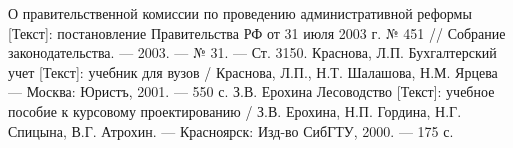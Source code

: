 \newpage 
{} 

\begin{thebibliography}{}
	 О правительственной комиссии по проведению административной реформы [Текст]: постановление Правительства РФ от 31 июля 2003 г. № 451 // Собрание законодательства. — 2003. — № 31. — Ст. 3150.
	 Краснова, Л.П. Бухгалтерский учет [Текст]: учебник для вузов / Краснова, Л.П., Н.Т. Шалашова, Н.М. Ярцева — Москва: Юристъ, 2001. — 550 с.
	 З.В. Ерохина Лесоводство [Текст]: учебное пособие к курсовому проектированию / З.В. Ерохина, Н.П. Гордина, Н.Г. Спицына, В.Г. Атрохин. — Красноярск: Изд-во СибГТУ, 2000. — 175 с.
\end{thebibliography}